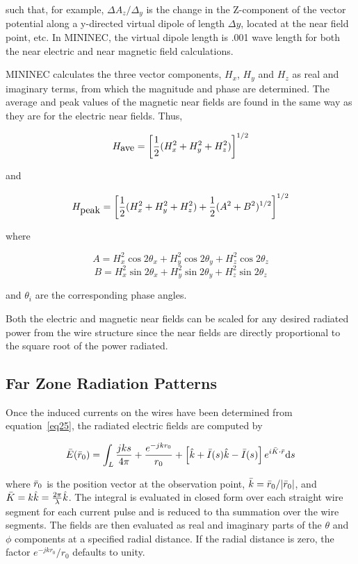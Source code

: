 \documentclass[12pt]{article}
\begin{document}
such that, for example, $\Delta A_z/\Delta_y$ is the change in the
Z-component of the vector potential along a y-directed virtual dipole of
length $\Delta y$, located at the near field point, etc. In MININEC, the
virtual dipole length is .001 wave length for both the near electric and
near magnetic field calculations.

MININEC calculates the three vector components, $H_x$, $H_y$ and $H_z$
as real and imaginary terms, from which the magnitude and phase are
determined. The average and peak values of the magnetic near fields are
found in the same way as they are for the electric near fields. Thus,

\begin{equation}
H_{\mbox{ave}} = \left[\frac{1}{2}(H_x^2 + H_y^2 + H_z^2)\right]^{1/2}
\label{eq39}
\end{equation}

\noindent and

\begin{equation}
H_{\mbox{peak}} = \left[\frac{1}{2}(H_x^2 + H_y^2 + H_z^2)
                +\frac{1}{2}(A^2 + B^2)^{1/2} \right]^{1/2}
\label{eq40}
\end{equation}

\noindent where

\[ A = H_x^2\cos 2\theta_x + H_y^2\cos2\theta_y + H_z^2\cos2\theta_z
\]
\[ B = H_x^2\sin 2\theta_x + H_y^2\sin2\theta_y + H_z^2\sin2\theta_z
\]

\noindent and $\theta_i$ are the corresponding phase angles.

Both the electric and magnetic near fields can be scaled for any desired
radiated power from the wire structure since the near fields are
directly proportional to the square root of the power radiated.

\subsection{Far Zone Radiation Patterns}
Once the induced currents on the wires have been determined from
equation~\eqref{eq25}, the radiated electric fields are computed by

\begin{equation}
\bar{E}(\bar{r}_0) = \int_L\frac{jks}{4\pi} + \frac{e^{-jkr_0}}{r_0}
+\left[\hat{k} + \bar{I}(s)\hat{k}-\bar{I}(s)\right]
e^{i\bar{K}\cdot\bar{r}}\mathrm{d}s
\label{eq41}
\end{equation}

\noindent where $\bar{r}_0$ is the position vector at the observation point,
$\bar{k} = \bar{r}_0 / |\bar{r}_0|$, and
$\bar{K} = k\hat{k} = \frac{2\pi}{\lambda}\hat{k}$. The integral is
evaluated in closed form over each straight wire segment for each
current pulse and is reduced to tha summation over the wire segments.
The fields are then evaluated as real and imaginary parts of the
$\theta$ and $\phi$ components at a specified radial distance. If the
radial distance is zero, the factor $e^{-jkr_0}/r_0$ defaults to unity.
\end{document}
